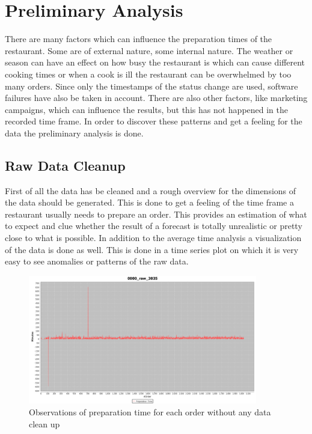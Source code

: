 \section{Preliminary Analysis}\label{section:Preliminary Analysis}
There are many factors which can influence the preparation times of the restaurant. Some are of external nature, some internal nature. The weather or season can have an effect on how busy the restaurant is which can cause different cooking times or when a cook is ill the restaurant can be overwhelmed by too many orders.\newline
Since only the timestamps of the status change are used, software failures have also be taken in account. There are also other factors, like marketing campaigns, which can influence the results, but this has not happened in the recorded time frame.\newline
In order to discover these patterns and get a feeling for the data the preliminary analysis is done.
\subsection{Raw Data Cleanup}\label{subsection:Raw Data Cleanup}
First of all the data has be cleaned and a rough overview for the dimensions of the data should be generated. This is done to get a feeling of the time frame a restaurant usually needs to prepare an order. This provides an estimation of what to expect and clue whether the result of a forecast is totally unrealistic or pretty close to what is possible. In addition to the average time analysis a visualization of the data is done as well. This is done in a time series plot on which it is very easy to see anomalies or patterns of the raw data.\newline

\begin{figure}[h]
\begin{center}
\includegraphics[width=10cm]{images/0000_raw_3035.png}
\caption{Observations of preparation time for each order without any data clean up}
\label{fig:0000_raw_3035}
\end{center}
\end{figure}


